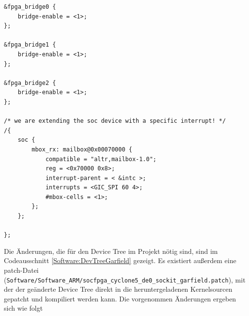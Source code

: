 \begin{lstlisting}[caption={[Änderungen am Device Tree]Notwendige Änderungen am Device Tree}, label=Software:DevTreeGarfield]
&fpga_bridge0 {
	bridge-enable = <1>;
};

&fpga_bridge1 {
	bridge-enable = <1>;
};

&fpga_bridge2 {
	bridge-enable = <1>;
};

/* we are extending the soc device with a specific interrupt! */
/{
	soc {
		mbox_rx: mailbox@0x00070000 {
			compatible = "altr,mailbox-1.0";
			reg = <0x70000 0x8>;
			interrupt-parent = < &intc >;
			interrupts = <GIC_SPI 60 4>;
			#mbox-cells = <1>;
		};
	};

};

\end{lstlisting}
Die Änderungen, die für den Device Tree im \Projectname Projekt nötig sind, sind im Codeausschnitt \ref{Software:DevTreeGarfield} gezeigt. Es existiert außerdem eine patch-Datei\\ (\texttt{Software/Software\_ARM/socfpga\_cyclone5\_de0\_sockit\_garfield.patch}), mit der der geänderte Device Tree direkt in die heruntergeladenen Kernelsourcen gepatcht und kompiliert werden kann. Die vorgenommen Änderungen ergeben sich wie folgt
